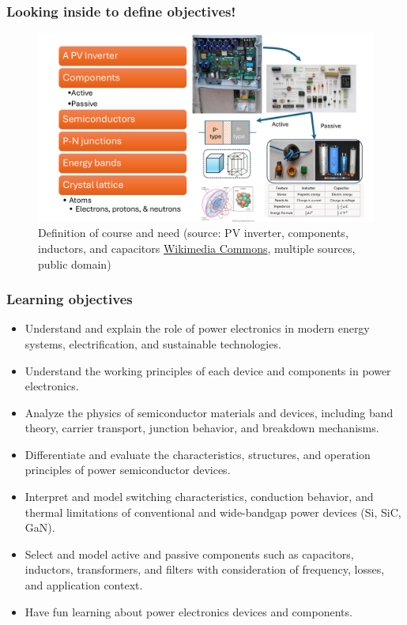 \begin{frame}
	\frametitle{Looking inside to define objectives!}
	\begin{figure}
		\centering
		\includegraphics[scale=0.35]{fig/lec01/Flow_of_components.pdf}
		\caption{Definition of course and need (source: PV inverter, components, inductors, and capacitors \href{https://commons.wikimedia.org/wiki/Main_Page}{Wikimedia Commons}, multiple sources, public domain)}
	\end{figure}
\end{frame}

\begin{frame}
	\frametitle{Learning objectives}
	\begin{itemize}
		\item Understand and explain the role of power electronics in modern energy systems, electrification, and sustainable technologies. 
		\item Understand the working principles of each device and components in power electronics.
		\item Analyze the physics of semiconductor materials and devices, including band theory, carrier transport, junction behavior, and breakdown mechanisms.
		\item Differentiate and evaluate the characteristics, structures, and operation principles of power semiconductor devices.
		\item Interpret and model switching characteristics, conduction behavior, and thermal limitations of conventional and wide-bandgap power devices (Si, SiC, GaN).
		\item Select and model active and passive components such as capacitors, inductors, transformers, and filters with consideration of frequency, losses, and application context.
		\item Have fun learning about power electronics devices and components.
	\end{itemize}
\end{frame}

